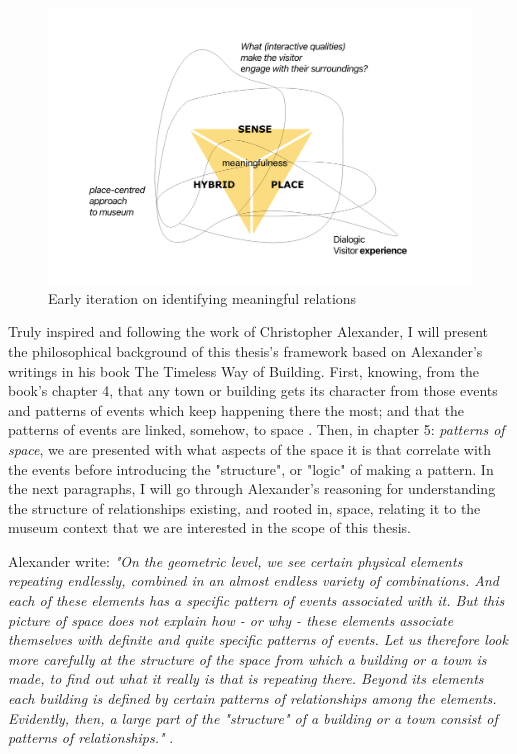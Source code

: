 \begin{figure}[H]
\centering 
\includegraphics[width=13cm]{pictures/Theory/early_iteration_framework.png}
\caption{Early iteration on identifying meaningful relations}
\end{figure}


Truly inspired and following the work of Christopher Alexander, I will present the philosophical background of this thesis's framework based on Alexander's writings in his book The Timeless Way of Building. First, knowing, from the book's chapter 4, that any town or building gets its character from those events and patterns of events which keep happening there the most; and that the patterns of events are linked, somehow, to space \autocite[p. 81]{Alexander_book}. Then, in chapter 5: \textit{patterns of space}, we are presented with what aspects of the space it is that correlate with the events before introducing the "structure", or "logic" of making a pattern. In the next paragraphs, I will go through Alexander's reasoning for understanding the structure of relationships existing, and rooted in, space, relating it to the museum context that we are interested in the scope of this thesis.

Alexander write: \emph{"On the geometric level, we see certain physical elements repeating endlessly, combined in an almost endless variety of combinations. And each of these elements has a specific pattern of events associated with it. But this picture of space does not explain how - or why - these elements associate themselves with definite and quite specific patterns of events. Let us therefore look more carefully at the structure of the space from which a building or a town is made, to find out what it really is that is repeating there. Beyond its elements each building is defined by certain patterns of relationships among the elements. Evidently, then, a large part of the "structure" of a building or a town consist of patterns of relationships."} \autocite[p. 82-83]{Alexander_book}.

